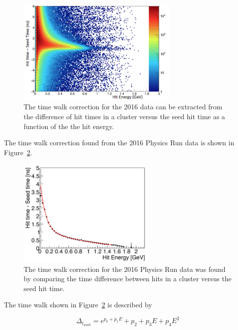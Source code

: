 \begin{figure}[htb]
  \centering
      \includegraphics[width=0.7\textwidth]{pics/performance/hittimeincluster.png}
  \caption[Hit times in a cluster versus the hit energy]{The time walk correction for the 2016 data can be extracted from the difference of hit times in a cluster versus the seed hit time as a function of the the hit energy.}
  \label{Figure:hittimeincluster}
\end{figure}

The time walk correction found from the 2016 Physics Run data is shown in Figure~\ref{Figure:twalk}. 

\begin{figure}[htb]
  \centering
      \includegraphics[width=0.6\textwidth]{pics/performance/twalk2016.png}
  \caption[Time walk correction for the Physics Run ECal data]{The time walk correction for the 2016 Physics Run data was found by comparing the time difference between hits in a cluster versus the seed hit time.}
  \label{Figure:twalk}
\end{figure}

The time walk shown in Figure~\ref{Figure:twalk} is described by 

\begin{equation}
	\label{eq:twalkEq}
		\Delta_{t_{walk}} = e^{p_0+p_1E}+p_2+p_3E+p_4E^2	
\end{equation}

